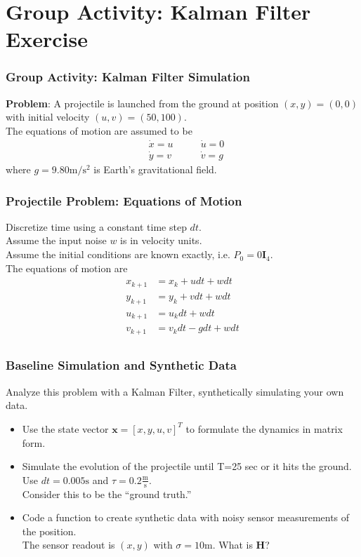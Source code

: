 \documentclass{beamer}
\renewcommand{\vec}[1]{\mathbf{#1}}
\newcommand{\vx}{\vec{x}}
\newcommand{\vH}{\vec{H}}
\newcommand{\Id}{\vec{I}}
\newcommand{\meter}{\text{m}}
\renewcommand{\sec}{\text{s}}
\begin{document}
\section{Group Activity: Kalman Filter Exercise}
\begin{frame}
\frametitle{Group Activity: Kalman Filter Simulation}
\textbf{Problem}: 
A projectile is launched from the ground at position $(x,y) = (0,0)$ 
with initial velocity $(u, v) = (50, 100)$. \\ \smallskip
The equations of motion are assumed to be
\begin{equation}
\begin{aligned}
&\dot{x} = u  \quad \quad & \dot{u} = 0 \\
&\dot{y} = v  \quad \quad  & \dot{v} = g
\end{aligned}
\end{equation}
where $g = 9.80 \text{m}/\text{s}^2$ is Earth's gravitational field. \\
\end{frame}

\begin{frame}
\frametitle{Projectile Problem: Equations of Motion}
Discretize time using a constant time step $dt$. \\ \smallskip
Assume the input noise $w$ is in velocity units.  \\ \smallskip
Assume the initial conditions are known exactly, i.e. $P_0 = 0 \Id_4$. \\
The equations of motion are
\begin{equation}
\begin{aligned}
x_{k+1} &= x_k + u  dt + w dt \\
y_{k+1} &= y_k + v  dt + w dt \\
u_{k+1} &= u_k dt + w dt \\
v_{k+1} &= v_k dt - g dt + w dt \\
\end{aligned}
\end{equation}
\end{frame}

\begin{frame}
\frametitle{Baseline Simulation and Synthetic Data}
Analyze this problem with a Kalman Filter, synthetically simulating your own data.
\begin{itemize}
\item Use the state vector $\vx = [x, y, u, v]^T$ to formulate the dynamics in matrix form.
\item Simulate the evolution of the projectile until T=25 sec or it hits the ground.
Use $dt = 0.005 \sec$ and $\tau = 0.2 \frac{\meter}{\sec}$. \\
Consider this to be the ``ground truth.''
\item Code a function to create synthetic data with noisy sensor measurements of the position. \\ 
The sensor readout is $(x, y)$ with $\sigma = 10 \text{m}$. What is $\vH$?
\end{itemize}
\end{frame}
\end{document}

